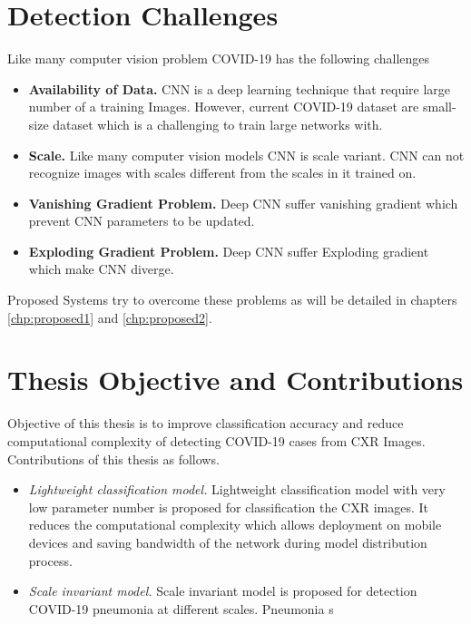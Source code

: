 \section{Detection Challenges}
Like many computer vision problem COVID-19 has the following challenges
\begin{itemize}

\item \textbf{Availability of Data.} CNN is a deep learning technique that require large number of a training Images. However, current COVID-19 dataset are small-size dataset which is a challenging to train large networks with. 
\item \textbf{Scale.} Like many computer vision models CNN is scale variant. CNN can not recognize images with scales different from the scales in it trained on.
\item \textbf{Vanishing Gradient Problem.} Deep CNN suffer vanishing gradient which prevent CNN parameters to be updated.
\item \textbf{Exploding Gradient Problem.} Deep CNN suffer Exploding gradient which make CNN diverge.
\end{itemize}
Proposed Systems try to overcome these problems as will be detailed in chapters \ref{chp:proposed1} and \ref{chp:proposed2}.

\section{Thesis Objective and Contributions}
Objective of this thesis is to improve classification accuracy and reduce computational complexity of detecting COVID-19 cases from CXR Images. Contributions of this thesis as follows.
\begin{itemize}
    \item \textit{Lightweight classification model.} Lightweight classification model with very low parameter number is proposed for classification the CXR images. It reduces the computational complexity which allows deployment on mobile devices and saving bandwidth of the network during model distribution process. 
    \item \textit{Scale invariant model.} Scale invariant model is proposed for detection COVID-19 pneumonia at different scales. Pneumonia s
\end{itemize}
